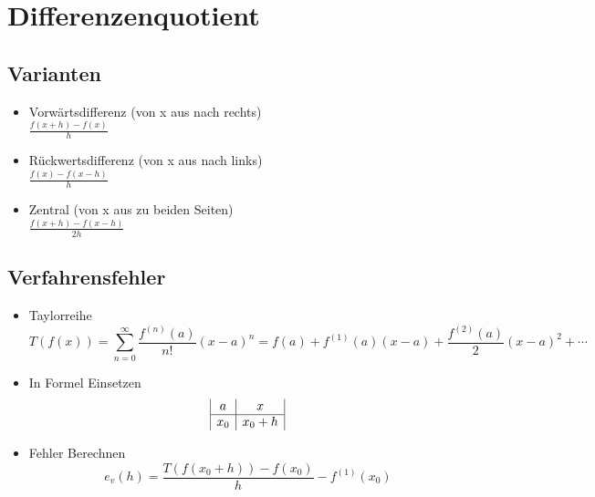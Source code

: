 \section{Differenzenquotient}

\subsection{Varianten}
\begin{itemize}

	\item Vorwärtsdifferenz (von x aus nach rechts) \\
	$\frac{f(x + h) - f(x)}{h}$
	
	\item Rückwertsdifferenz (von x aus nach links) \\
	$\frac{f(x) - f(x - h)}{h}$
	
	\item Zentral (von x aus zu beiden Seiten) \\
	$\frac{f(x + h) - f(x - h)}{2h}$

\end{itemize}

\subsection{Verfahrensfehler}
\begin{itemize}

	\item Taylorreihe \\
	\begin{equation*}
		T(f(x)) = \sum_{n=0}^{\infty}\frac{f^{(n)}(a)}{n!} (x - a)^n 
		= f(a) + f^{(1)}(a)(x - a) + \frac{f^{(2)}(a)}{2} (x - a)^2 + \cdots
	\end{equation*}
	
	\item In Formel Einsetzen \\
	\begin{displaymath}
		\begin{array}{| c | c |}
			a & x \\
			\hline
			x_0 & x_0 + h \\
		\end{array}
	\end{displaymath}
	
	\item Fehler Berechnen \\
	\begin{equation*}
		e_v(h) = \frac{T(f(x_0 + h)) - f(x_0)}{h} - f^{(1)}(x_0)	
	\end{equation*}

\end{itemize}

